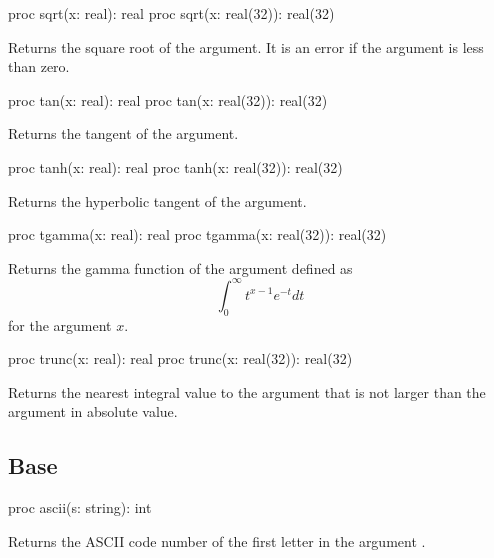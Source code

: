 \begin{protohead}
proc sqrt(x: real): real
proc sqrt(x: real(32)): real(32)
\end{protohead}
\begin{protobody}
Returns the square root of the argument.  It is an error if the
argument is less than zero.
\end{protobody}

\begin{protohead}
proc tan(x: real): real
proc tan(x: real(32)): real(32)
\end{protohead}
\begin{protobody}
Returns the tangent of the argument.
\end{protobody}

\begin{protohead}
proc tanh(x: real): real
proc tanh(x: real(32)): real(32)
\end{protohead}
\begin{protobody}
Returns the hyperbolic tangent of the argument.
\end{protobody}

\begin{protohead}
proc tgamma(x: real): real
proc tgamma(x: real(32)): real(32)
\end{protohead}
\begin{protobody}
Returns the gamma function of the argument defined as
$$\int_0^\infty t^{x-1} e^{-t} dt$$
for the argument $x$.
\end{protobody}

\begin{protohead}
proc trunc(x: real): real
proc trunc(x: real(32)): real(32)
\end{protohead}
\begin{protobody}
Returns the nearest integral value to the argument that is not larger
than the argument in absolute value.
\end{protobody}


\subsection{Base}
\label{Standard}

\begin{protohead}
proc ascii(s: string): int
\end{protohead}
\begin{protobody}
Returns the ASCII code number of the first letter in the
argument .
\end{protobody}

